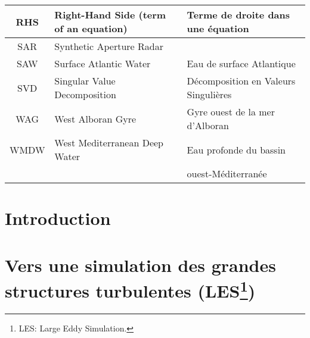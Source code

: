 \documentclass[a4paper,12pt,notitlepage,twoside]{report}
\numberwithin{equation}{section}
\begin{document}
\begin{table}[!h]
\begin{tabular}{|c|ll|}
                \hline
                RHS & Right-Hand Side (term of an equation) & Terme de droite dans une équation \\
                \hline
                SAR & Synthetic Aperture Radar & \\
                \hline
                SAW & Surface Atlantic Water & Eau de surface Atlantique\\
                \hline
                SVD & Singular Value Decomposition & Décomposition en Valeurs Singulières  \\
                \hline
                WAG & West Alboran Gyre & Gyre ouest de la mer d'Alboran\\
                \hline
                WMDW & West Mediterranean Deep Water & Eau profonde du bassin\\
                & &ouest-Méditerranée\\
                \hline
        \end{tabular}
\end{table} 


\newpage
\chapter{Introduction}
\label{chapINTRO}



\newpage
 \null
 
\chapter[Vers une simulation des grandes structures turbulentes]{Vers une simulation des grandes structures turbulentes (LES\footnote{LES: Large Eddy Simulation.\label{LES}})}
\label{chap2}

\end{document}
